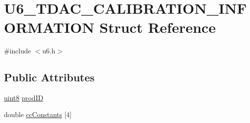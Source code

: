 \hypertarget{structU6__TDAC__CALIBRATION__INFORMATION}{\section{U6\-\_\-\-T\-D\-A\-C\-\_\-\-C\-A\-L\-I\-B\-R\-A\-T\-I\-O\-N\-\_\-\-I\-N\-F\-O\-R\-M\-A\-T\-I\-O\-N Struct Reference}
\label{structU6__TDAC__CALIBRATION__INFORMATION}
}


{\ttfamily \#include $<$u6.\-h$>$}

\subsection*{Public Attributes}
\begin{DoxyCompactItemize}
\item 
\hyperlink{u6_8h_adde6aaee8457bee49c2a92621fe22b79}{uint8} \hyperlink{structU6__TDAC__CALIBRATION__INFORMATION_a712075dcac43ecc629ba0908bb2e59f9}{prod\-I\-D}
\item 
double \hyperlink{structU6__TDAC__CALIBRATION__INFORMATION_a7aab6102304d21a37162d00db515cec6}{cc\-Constants} \mbox{[}4\mbox{]}
\end{DoxyCompactItemize}


